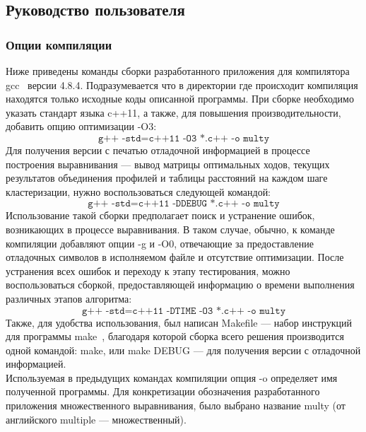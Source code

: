 \subsection[Руководство пользователя]{\large Руководство пользователя}
\subsubsection[Опции компиляции]{\large Опции компиляции}
\hspace{\parindent} Ниже приведены команды сборки разработанного приложения для компилятора gcc~\cite{GCC} версии 4.8.4. Подразумевается что в директории где происходит компиляция находятся только исходные коды описанной программы. При сборке необходимо указать стандарт языка c++11, а также, для повышения производительности, добавить опцию оптимизации -O3:
\begin{equation*}
\texttt{g++ -std=c++11 -O3 *.c++ -o multy}
\end{equation*}
\indent Для получения версии с печатью отладочной информацией в процессе построения выравнивания --- вывод матрицы оптимальных ходов, текущих результатов объединения профилей и таблицы расстояний на каждом шаге кластеризации, нужно воспользоваться следующей командой:
\begin{equation*}
\texttt{g++ -std=c++11 -DDEBUG *.c++ -o multy}
\end{equation*}
\indent Использование такой сборки предполагает поиск и устранение ошибок, возникающих в процессе выравнивания. В таком случае, обычно, к команде компиляции добавляют опции -g и -O0, отвечающие за предоставление отладочных символов в исполняемом файле и отсутствие оптимизации. После устранения всех ошибок и переходу к этапу тестирования, можно воспользоваться сборкой, предоставляющей информацию о времени выполнения различных этапов алгоритма:
\begin{equation*}
\texttt{g++ -std=c++11 -DTIME -O3 *.c++ -o multy}
\end{equation*}
\indent Также, для удобства использования, был написан Makefile --- набор инструкций для программы make~\cite{MAKE}, благодаря которой сборка всего решения производится одной командой: make, или make DEBUG --- для получения версии с отладочной информацией.\\
\indent Используемая в предыдущих командах компиляции опция -o определяет имя полученной программы. Для конкретизации обозначения разработанного приложения множественного выравнивания, было выбрано название multy (от английского multiple --- множественный).

